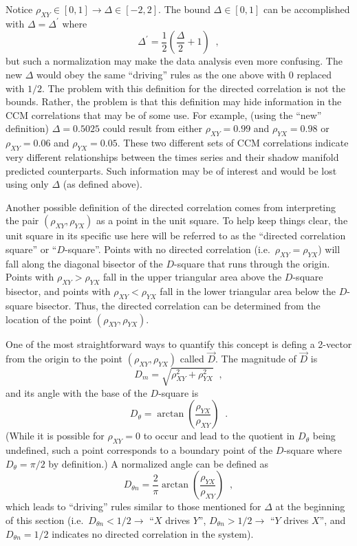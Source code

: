 \documentclass[a4paper,11pt]{article}
\begin{document}
Notice $\rho_{XY}\in[0,1]\rightarrow\Delta\in[-2,2]$.  The bound $\Delta\in[0,1]$ can be accomplished with $\Delta=\Delta^\prime$ where
$$
\Delta^\prime = \frac{1}{2}\left(\frac{\Delta}{2}+1\right)\;\;,
$$
but such a normalization may make the data analysis even more confusing.  The new $\Delta$ would obey the same ``driving'' rules as the one above with $0$ replaced with $1/2$.  The problem with this definition for the directed correlation is not the bounds.  Rather, the problem is that this definition may hide information in the CCM correlations that may be of some use.  For example, (using the ``new'' definition) $\Delta = 0.5025$ could result from either $\rho_{XY} = 0.99$ and $\rho_{YX} = 0.98$ or $\rho_{XY} = 0.06$ and $\rho_{YX} = 0.05$.  These two different sets of CCM correlations indicate very different relationships between the times series and their shadow manifold predicted counterparts.  Such information may be of interest and would be lost using only $\Delta$ (as defined above).

Another possible definition of the directed correlation comes from interpreting the pair $\left(\rho_{XY},\rho_{YX}\right)$ as a point in the unit square.  To help keep things clear, the unit square in its specific use here will be referred to as the ``directed correlation square'' or ``$D$-square''.  Points with no directed correlation (i.e.\ $\rho_{XY}=\rho_{YX}$) will fall along the diagonal bisector of the $D$-square that runs through the origin.  Points with $\rho_{XY}>\rho_{YX}$ fall in the upper triangular area above the $D$-square bisector, and points with $\rho_{XY}<\rho_{YX}$ fall in the lower triangular area below the $D$-square bisector.  Thus, the directed correlation can be determined from the location of the point $\left(\rho_{XY},\rho_{YX}\right)$.

One of the most straightforward ways to quantify this concept is defing a 2-vector from the origin to the point $\left(\rho_{XY},\rho_{YX}\right)$ called $\vec{D}$.  The magnitude of $\vec{D}$ is 
$$
D_m = \sqrt{\rho_{XY}^2+\rho_{YX}^2}\;\;,
$$
and its angle with the base of the $D$-square is
$$
D_\theta = \arctan\left(\frac{\rho_{YX}}{\rho_{XY}}\right)\;\;.
$$
(While it is possible for $\rho_{XY}=0$ to occur and lead to the quotient in $D_\theta$ being undefined, such a point corresponds to a boundary point of the $D$-square where $D_\theta = \pi/2$ by definition.)  A normalized angle can be defined as
$$
D_{\theta n} = \frac{2}{\pi}\arctan\left(\frac{\rho_{YX}}{\rho_{XY}}\right)\;\;,
$$
which leads to ``driving'' rules similar to those mentioned for $\Delta$ at the beginning of this section (i.e.\ $D_{\theta n}<1/2\rightarrow$ ``$X$ drives $Y$'', $D_{\theta n}>1/2\rightarrow$ ``$Y$ drives $X$'', and $D_{\theta n}=1/2$ indicates no directed correlation in the system).  
\end{document}
